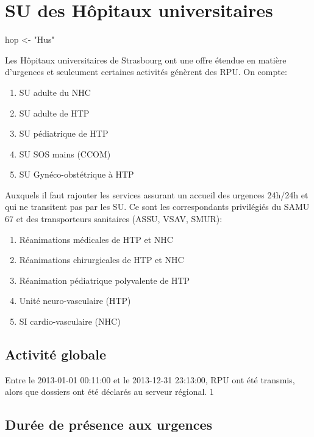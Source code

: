 \documentclass[12pt,english,french,twoside]{book}\usepackage[]{graphicx}\usepackage[]{color}
\begin{document}
\chapter{SU des Hôpitaux universitaires}


hop <- "Hus"


Les Hôpitaux universitaires de Strasbourg ont une offre étendue en matière d'urgences et seuleument certaines activités génèrent des RPU.
On compte:
\begin{enumerate}
  \item SU adulte du NHC
  \item SU adulte de HTP
  \item SU pédiatrique de HTP
  \item SU SOS mains (CCOM)
  \item SU Gynéco-obstétrique à HTP
\end{enumerate}
Auxquels il faut rajouter les services assurant un accueil des urgences 24h/24h et qui ne transitent pas par les SU. Ce sont les correspondants privilégiés du SAMU 67 et des transporteurs sanitaires (ASSU, VSAV, SMUR):
\begin{enumerate}
  \item Réanimations médicales de HTP et NHC
  \item Réanimations chirurgicales de HTP et NHC
  \item Réanimation pédiatrique polyvalente de HTP
  \item Unité neuro-vasculaire (HTP)
  \item SI cardio-vasculaire (NHC)
\end{enumerate}

\section{Activité globale}




Entre le 2013-01-01 00:11:00 et le 2013-12-31 23:13:00,  RPU ont été transmis, alors que  dossiers ont été déclarés au serveur régional. 
1

\section*{Durée de présence aux urgences}
\end{document}
